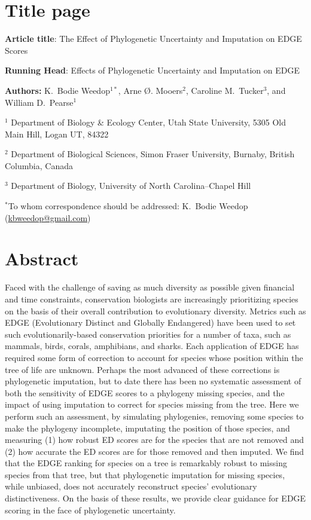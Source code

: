 \documentclass[10pt,english]{article}
\begin{document}
\setlength{\parindent}{0pt}
\section*{Title page}

\textbf{Article title}: The Effect of Phylogenetic Uncertainty and Imputation on EDGE Scores

\textbf{Running Head}: Effects of Phylogenetic Uncertainty and Imputation on EDGE

\textbf{Authors:} K.\ Bodie Weedop$^{1*}$, Arne \O. Mooers$^2$, Caroline M.\ Tucker$^3$, and William D.\ Pearse$^{1}$\

$^1$ Department of Biology \& Ecology Center, Utah State University,
5305 Old Main Hill, Logan UT, 84322

$^2$ Department of Biological Sciences, Simon Fraser University, Burnaby,
British Columbia, Canada

$^3$ Department of Biology, University of North Carolina–Chapel Hill

$^*$To whom correspondence should be addressed: K.\ Bodie Weedop (\url{kbweedop@gmail.com})

\clearpage
\section*{Abstract}

Faced with the challenge of saving as much diversity as possible given financial
and time constraints, conservation biologists are increasingly prioritizing
species on the basis of their overall contribution to evolutionary diversity.
Metrics such as EDGE (Evolutionary Distinct and Globally Endangered) have been
used to set such evolutionarily-based conservation priorities for a number of
taxa, such as mammals, birds, corals, amphibians, and sharks. Each application
of EDGE has required some form of correction to account for species whose
position within the tree of life are unknown. Perhaps the most advanced of these
corrections is phylogenetic imputation, but to date there has been no systematic
assessment of both the sensitivity of EDGE scores to a phylogeny missing
species, and the impact of using imputation to correct for species missing from
the tree. Here we perform such an assessment, by simulating phylogenies,
removing some species to make the phylogeny incomplete, imputating the position
of those species, and measuring (1) how robust ED scores are for the species
that are not removed and (2) how accurate the ED scores are for those removed
and then imputed. We find that the EDGE ranking for species on a tree is
remarkably robust to missing species from that tree, but that phylogenetic
imputation for missing species, while unbiased, does not accurately reconstruct
species’ evolutionary distinctiveness. On the basis of these results, we provide
clear guidance for EDGE scoring in the face of phylogenetic uncertainty.
\end{document}
